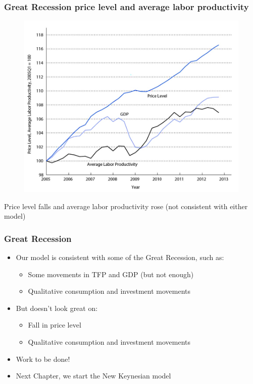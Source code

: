 \documentclass{beamer}
\begin{document}
\begin{frame}
\frametitle[alignment=center]{Great Recession price level and average labor productivity}
\begin{figure}
\centering
\includegraphics[scale=0.65]{Figures/W_Fig_13pt15.png}
\end{figure}
Price level falls and average labor productivity rose (not consistent with either model)
\end{frame}


\begin{frame}
\frametitle[alignment=center]{Great Recession}
\begin{itemize}
\item Our model is consistent with some of the Great Recession, such as:
\begin{itemize}
\item Some movements in TFP and GDP (but not enough)
\item Qualitative consumption and investment movements
\end{itemize}
\item But doesn't look great on:
\begin{itemize}
\item Fall in price level
\item Qualitative consumption and investment movements
\end{itemize}
\item Work to be done!
\bigskip
\item Next Chapter, we start the New Keynesian model
\end{itemize}
\end{frame}
\end{document}
